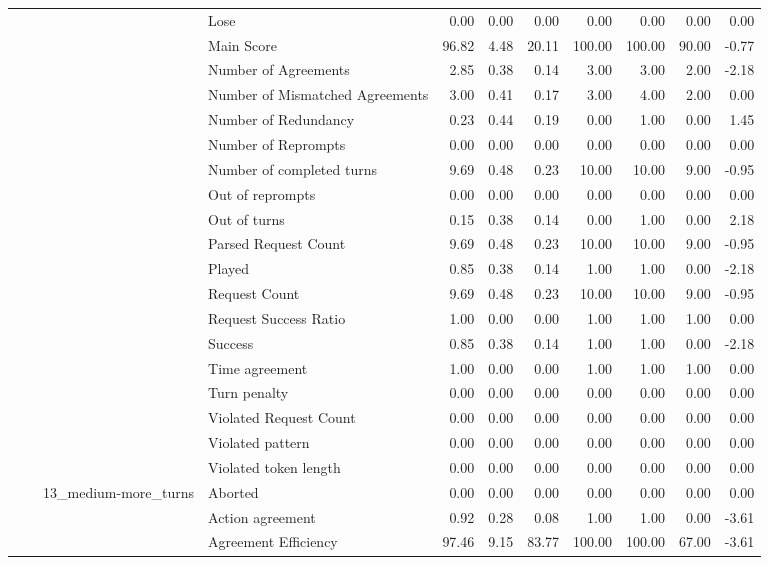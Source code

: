 \begin{tabular}{llllrrrrrrr}
 &  &  & Lose & 0.00 & 0.00 & 0.00 & 0.00 & 0.00 & 0.00 & 0.00 \\
 &  &  & Main Score & 96.82 & 4.48 & 20.11 & 100.00 & 100.00 & 90.00 & -0.77 \\
 &  &  & Number of Agreements & 2.85 & 0.38 & 0.14 & 3.00 & 3.00 & 2.00 & -2.18 \\
 &  &  & Number of Mismatched Agreements & 3.00 & 0.41 & 0.17 & 3.00 & 4.00 & 2.00 & 0.00 \\
 &  &  & Number of Redundancy & 0.23 & 0.44 & 0.19 & 0.00 & 1.00 & 0.00 & 1.45 \\
 &  &  & Number of Reprompts & 0.00 & 0.00 & 0.00 & 0.00 & 0.00 & 0.00 & 0.00 \\
 &  &  & Number of completed turns & 9.69 & 0.48 & 0.23 & 10.00 & 10.00 & 9.00 & -0.95 \\
 &  &  & Out of reprompts & 0.00 & 0.00 & 0.00 & 0.00 & 0.00 & 0.00 & 0.00 \\
 &  &  & Out of turns & 0.15 & 0.38 & 0.14 & 0.00 & 1.00 & 0.00 & 2.18 \\
 &  &  & Parsed Request Count & 9.69 & 0.48 & 0.23 & 10.00 & 10.00 & 9.00 & -0.95 \\
 &  &  & Played & 0.85 & 0.38 & 0.14 & 1.00 & 1.00 & 0.00 & -2.18 \\
 &  &  & Request Count & 9.69 & 0.48 & 0.23 & 10.00 & 10.00 & 9.00 & -0.95 \\
 &  &  & Request Success Ratio & 1.00 & 0.00 & 0.00 & 1.00 & 1.00 & 1.00 & 0.00 \\
 &  &  & Success & 0.85 & 0.38 & 0.14 & 1.00 & 1.00 & 0.00 & -2.18 \\
 &  &  & Time agreement & 1.00 & 0.00 & 0.00 & 1.00 & 1.00 & 1.00 & 0.00 \\
 &  &  & Turn penalty & 0.00 & 0.00 & 0.00 & 0.00 & 0.00 & 0.00 & 0.00 \\
 &  &  & Violated Request Count & 0.00 & 0.00 & 0.00 & 0.00 & 0.00 & 0.00 & 0.00 \\
 &  &  & Violated pattern & 0.00 & 0.00 & 0.00 & 0.00 & 0.00 & 0.00 & 0.00 \\
 &  &  & Violated token length & 0.00 & 0.00 & 0.00 & 0.00 & 0.00 & 0.00 & 0.00 \\
\cline{3-11}
 &  & \multirow[t]{27}{*}{13_medium-more_turns} & Aborted & 0.00 & 0.00 & 0.00 & 0.00 & 0.00 & 0.00 & 0.00 \\
 &  &  & Action agreement & 0.92 & 0.28 & 0.08 & 1.00 & 1.00 & 0.00 & -3.61 \\
 &  &  & Agreement Efficiency & 97.46 & 9.15 & 83.77 & 100.00 & 100.00 & 67.00 & -3.61 \\

\end{tabular}
